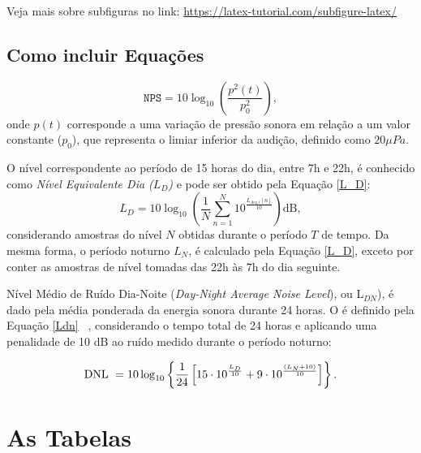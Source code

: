 Veja mais sobre subfiguras no link: \url{https://latex-tutorial.com/subfigure-latex/}

\subsection{Como incluir Equações}

\begin{equation}
    \texttt{NPS} = 10 \log_{10} \left (\frac{p^2(t)}{p_0^2} \right ),
\end{equation}
onde ${p(t)}$ corresponde a uma variação de pressão sonora em relação a um valor constante ($p_0$), que representa o limiar inferior da audição, definido como $20\mu Pa$. 

O nível correspondente ao período de 15 horas do dia, entre 7h e 22h, é conhecido como \textit{Nível Equivalente Dia ($L_D$)} e pode ser obtido pela Equação \ref{L_D}:
    \begin{equation}
    L_D =  10 \log_{10}\left( \frac{1}{N} \sum_{n=1}^{N} 10^{\frac{L_{Aeq,t}[n]}{10}} \right) \mbox{dB},
    \label{L_D}
    \end{equation}	
considerando amostras do nível $N$ obtidas durante o período $ T $ de tempo. Da mesma forma, o período noturno $L_N$, é calculado pela Equação \ref{L_D}, exceto por conter as amostras de nível tomadas das 22h às 7h do dia seguinte.    

 Nível Médio de Ruído Dia-Noite (\textit{Day-Night Average Noise Level}), \dnl ou L$_ {DN} $), é dado pela média ponderada da energia sonora durante 24 horas. O \dnl é definido pela Equação \ref{Ldn} ~\cite{SILVA2016}, considerando o tempo total de 24 horas e aplicando uma penalidade de 10 dB ao ruído medido durante o período noturno:

\begin{equation}
	\mbox{DNL } = 10 \log_{10} \left\{ \frac{1}{24} \left[ 15 \cdot 10^{\frac{L_D}{10}} + 9 \cdot 10^{\frac{(L_N + 10)}{10}} \right] \right\}.
	\label{Ldn}
\end{equation}

\section{As Tabelas}

